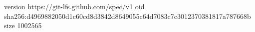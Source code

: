 version https://git-lfs.github.com/spec/v1
oid sha256:d4969882050d1c60cd8d3842d8649055c64d7083c7c3012370381817a787668b
size 1002565
